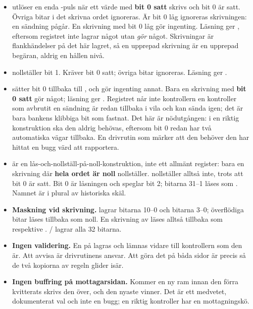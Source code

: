 \begin{itemize}
  \item \textbf{} utlöser en enda -puls när ett värde med \textbf{bit 0
    satt} skrivs och  bit 0 är satt. Övriga bitar i det skrivna ordet ignoreras. Är
     bit 0 låg ignoreras skrivningen: en sändning pågår. En skrivning med bit 0 låg gör
    ingenting. Läsning ger , eftersom registret inte lagrar något utan \emph{gör}
    något. Skrivningar är flankhändelser på det här lagret, så en upprepad skrivning är en upprepad
    begäran, aldrig en hållen nivå.
  \item \textbf{} nollställer  bit 1. Kräver bit 0 satt; övriga bitar
    ignoreras. Läsning ger .
  \item \textbf{} sätter  bit 0 tillbaka till , och gör
    ingenting annat. Bara en skrivning med \textbf{bit 0 satt} gör något; läsning ger
    . Registret når inte kontrollern \textemdash{} en kontroller som avbrutit en
    sändning är redan tillbaka i vila och kan sända igen; det är bara bankens klibbiga bit som
    fastnat. Det här är nödutgången: i en riktig konstruktion ska den aldrig behövas, eftersom bit 0
    redan har två automatiska vägar tillbaka. En drivrutin som märker att den behöver den har hittat
    en bugg värd att rapportera.
  \item \textbf{} är en lås-och-nollställ-på-noll-konstruktion, inte ett allmänt
    register: bara en skrivning där \textbf{hela ordet är noll} nollställer. 
    nollställer alltså inte, trots att bit 0 är satt. Bit 0 är låsningen och speglar 
    bit 2; bitarna 31--1 läses som . Namnet är i plural av historiska skäl.
  \item \textbf{Maskning vid skrivning.}  lagrar bitarna 10--0 och 
    bitarna 3--0; överflödiga bitar läses tillbaka som noll. En skrivning av  läses
    alltså tillbaka som  respektive .
    / lagrar alla 32 bitarna.
  \item \textbf{Ingen validering.} En  på  lagras och lämnas vidare till
    kontrollern som den är. Att avvisa  är drivrutinens ansvar. Att göra det på båda
    sidor är precis så de två kopiorna av regeln glider isär.
  \item \textbf{Ingen buffring på mottagarsidan.} Kommer en ny ram innan den förra kvitterats skrivs
    den över, och den nyaste vinner. Det är ett medvetet, dokumenterat val och inte en bugg; en
    riktig kontroller har en mottagningskö.
\end{itemize}

